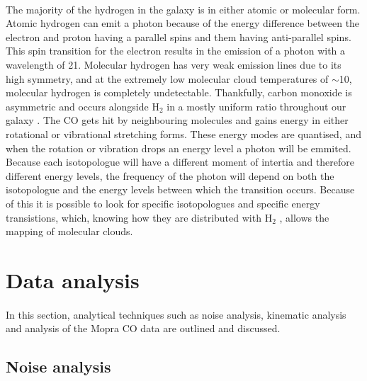 \documentclass[a4paper, titlepage, oneside]{article}
\newcommand{\molec}[2]{\ensuremath{\text{#1}_{#2}}}
\begin{document}
\begin{multicols}{2}
\paragraph{}
The majority of the hydrogen in the galaxy is in either atomic or molecular form. Atomic hydrogen can emit a photon because of the energy difference between the electron and proton having a parallel spins and them having anti-parallel spins. This spin transition for the electron results in the emission of a photon with a wavelength of \unit{21}{\centi\metre}. Molecular hydrogen has very weak emission lines due to its high symmetry, and at the extremely low molecular cloud temperatures of \(\sim\)\unit{10}{\kelvin}, molecular hydrogen is completely undetectable. Thankfully, carbon monoxide is asymmetric and occurs alongside \molec{H}{2} in a mostly uniform ratio throughout our galaxy \parencite{Neininger:1998}. The CO gets hit by neighbouring molecules and gains energy in either rotational or vibrational stretching forms. These energy modes are quantised, and when the rotation or vibration drops an energy level a photon will be emmited. Because each isotopologue will have a different moment of intertia and therefore different energy levels, the frequency of the photon will depend on both the isotopologue and the energy levels between which the transition occurs. Because of this it is possible to look for specific isotopologues and specific energy transistions, which, knowing how they are distributed with \molec{H}{2} , allows the mapping of molecular clouds.


\section{Data analysis}
\paragraph{}
In this section, analytical techniques such as noise analysis, kinematic analysis and analysis of the Mopra CO data are outlined and discussed.

\subsection{Noise analysis}

\end{multicols}
\end{document}
